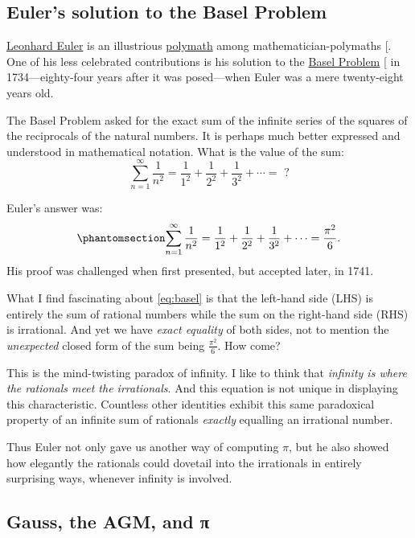\documentclass[
  a4paper,
]{article}
\begin{document}
\subsection{Euler's solution to the Basel
Problem}\label{eulers-solution-to-the-basel-problem}

\href{https://en.wikipedia.org/wiki/Leonhard_Euler}{Leonhard Euler} is
an illustrious
\href{https://www.thefreedictionary.com/polymath}{polymath} among
mathematician-polymaths {[}\citeproc{ref-euler-dunham-1999}{28}{]}. One
of his less celebrated contributions is his solution to the
\href{https://en.wikipedia.org/wiki/Basel_problem}{Basel Problem}
{[}\citeproc{ref-basel-problem}{29}{]} in 1734---eighty-four years after
it was posed---when Euler was a mere twenty-eight years old.

The Basel Problem asked for the exact sum of the infinite series of the
squares of the reciprocals of the natural numbers. It is perhaps much
better expressed and understood in mathematical notation. What is the
value of the sum: \[
\sum_{n=1}^\infty \frac{1}{n^2} = \frac{1}{1^2} + \frac{1}{2^2} + \frac{1}{3^2} + \cdots = \mbox{ ?}
\]

Euler's answer was: \begin{equation}\phantomsection\label{eq:basel}{
\sum_{n=1}^\infty \frac{1}{n^2} = \frac{1}{1^2} + \frac{1}{2^2} + \frac{1}{3^2} + \cdots = \frac{\pi^2}{6}.
}\end{equation} His proof was challenged when first presented, but
accepted later, in 1741.

What I find fascinating about \cref{eq:basel} is that the left-hand side
(LHS) is entirely the sum of rational numbers while the sum on the
right-hand side (RHS) is irrational. And yet we have \emph{exact
equality} of both sides, not to mention the \emph{unexpected} closed
form of the sum being \(\tfrac{\pi^2}{6}\). How come?

This is the mind-twisting paradox of infinity. I like to think that
\emph{infinity is where the rationals meet the irrationals}. And this
equation is not unique in displaying this characteristic. Countless
other identities exhibit this same paradoxical property of an infinite
sum of rationals \emph{exactly} equalling an irrational number.

Thus Euler not only gave us another way of computing \(\pi\), but he
also showed how elegantly the rationals could dovetail into the
irrationals in entirely surprising ways, whenever infinity is involved.

\subsection{Gauss, the AGM, and π}\label{gauss-the-agm-and-ux3c0}
\end{document}
